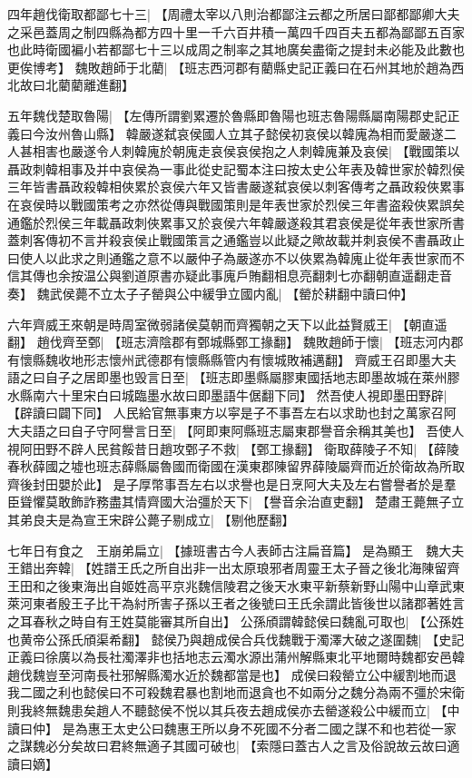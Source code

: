 四年趙伐衛取都鄙七十三|{
	【周禮太宰以八則治都鄙注云都之所居曰鄙都鄙卿大夫之采邑蓋周之制四縣為都方四十里一千六百井積一萬四千四百夫五都為鄙鄙五百家也此時衛國褊小若都鄙七十三以成周之制率之其地廣矣盡衛之提封未必能及此數也更俟博考】}
魏敗趙師于北藺|{
	【班志西河郡有藺縣史記正義曰在石州其地於趙為西北故曰北藺藺離進翻】}
\par
五年魏伐楚取魯陽|{
	【左傳所謂劉累遷於魯縣即魯陽也班志魯陽縣屬南陽郡史記正義曰今汝州魯山縣】}
韓嚴遂弑哀侯國人立其子懿侯初哀侯以韓廆為相而愛嚴遂二人甚相害也嚴遂令人刺韓廆於朝廆走哀侯哀侯抱之人刺韓廆兼及哀侯|{
	【戰國策以聶政刺韓相事及并中哀侯為一事此從史記蜀本注曰按太史公年表及韓世家於韓烈侯三年皆書聶政殺韓相俠累於哀侯六年又皆書嚴遂弑哀侯以刺客傳考之聶政殺俠累事在哀侯時以戰國策考之亦然從傳與戰國策則是年表世家於烈侯三年書盗殺俠累誤矣通鑑於烈侯三年載聶政刺俠累事又於哀侯六年韓嚴遂殺其君哀侯是從年表世家所書蓋刺客傳初不言并殺哀侯止戰國策言之通鑑豈以此疑之歟故載并刺哀侯不書聶政止曰使人以此求之則通鑑之意不以嚴仲子為嚴遂亦不以俠累為韓廆止從年表世家而不信其傳也余按温公與劉道原書亦疑此事廆戶賄翻相息亮翻刺七亦翻朝直遥翻走音奏】}
魏武侯薨不立太子子罃與公中緩爭立國内亂|{
	【罃於耕翻中讀曰仲】}
\par
六年齊威王來朝是時周室微弱諸侯莫朝而齊獨朝之天下以此益賢威王|{
	【朝直遥翻】}
趙伐齊至鄄|{
	【班志濟陰郡有鄄城縣鄄工掾翻】}
魏敗趙師于懷|{
	【班志河内郡有懷縣魏收地形志懷州武德郡有懷縣縣管内有懷城敗補邁翻】}
齊威王召即墨大夫語之曰自子之居即墨也毁言日至|{
	【班志即墨縣屬膠東國括地志即墨故城在萊州膠水縣南六十里宋白曰城臨墨水故曰即墨語牛倨翻下同】}
然吾使人視即墨田野辟|{
	【辟讀曰闢下同】}
人民給官無事東方以寜是子不事吾左右以求助也封之萬家召阿大夫語之曰自子守阿譽言日至|{
	【阿即東阿縣班志屬東郡譽音余稱其美也】}
吾使人視阿田野不辟人民貧餒昔日趙攻鄄子不救|{
	【鄄工掾翻】}
衛取薛陵子不知|{
	【薛陵春秋薛國之墟也班志薛縣屬魯國而衛國在漢東郡陳留界薛陵屬齊而近於衛故為所取齊後封田嬰於此】}
是子厚幣事吾左右以求譽也是日烹阿大夫及左右嘗譽者於是羣臣聳懼莫敢飾詐務盡其情齊國大治彊於天下|{
	【譽音余治直吏翻】}
楚肅王薨無子立其弟良夫是為宣王宋辟公薨子剔成立|{
	【剔他歷翻】}
\par
七年日有食之　王崩弟扁立|{
	【據班書古今人表師古注扁音篇】}
是為顯王　魏大夫王錯出奔韓|{
	【姓譜王氏之所自出非一出太原琅邪者周靈王太子晉之後北海陳留齊王田和之後東海出自姬姓高平京兆魏信陵君之後天水東平新蔡新野山陽中山章武東萊河東者殷王子比干為紂所害子孫以王者之後號曰王氏余謂此皆後世以諸郡著姓言之耳春秋之時自有王姓莫能審其所自出】}
公孫頎謂韓懿侯曰魏亂可取也|{
	【公孫姓也黄帝公孫氏頎渠希翻】}
懿侯乃與趙成侯合兵伐魏戰于濁澤大破之遂圍魏|{
	【史記正義曰徐廣以為長社濁澤非也括地志云濁水源出蒲州解縣東北平地爾時魏都安邑韓趙伐魏豈至河南長社邪解縣濁水近於魏都當是也】}
成侯曰殺罃立公中緩割地而退我二國之利也懿侯曰不可殺魏君暴也割地而退貪也不如兩分之魏分為兩不彊於宋衛則我終無魏患矣趙人不聽懿侯不悦以其兵夜去趙成侯亦去罃遂殺公中緩而立|{
	【中讀曰仲】}
是為惠王太史公曰魏惠王所以身不死國不分者二國之謀不和也若從一家之謀魏必分矣故曰君終無適子其國可破也|{
	【索隱曰蓋古人之言及俗說故云故曰適讀曰嫡】}
\par
